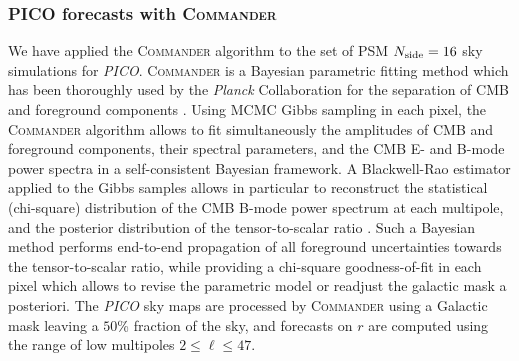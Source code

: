 \documentclass[PICOReport.tex]{subfiles}
\begin{document}
\subsubsection{ PICO forecasts with \textsc{Commander}}

We have applied the \textsc{Commander} algorithm \cite{eriksen/etal:2008} to the set of PSM $N_{\rm side}=16$ sky simulations for \emph{PICO}.
\textsc{Commander} is a Bayesian parametric fitting method which has been thoroughly used by the \emph{Planck} Collaboration for the separation of CMB and foreground components \cite{Planck_2015_X,Planck_2018_IV}. Using MCMC Gibbs sampling in each pixel, the \textsc{Commander} algorithm allows to fit simultaneously the amplitudes of CMB and foreground components, their spectral parameters, and the CMB E- and B-mode power spectra in a self-consistent Bayesian framework. A Blackwell-Rao estimator applied to the Gibbs samples allows in particular to reconstruct the statistical (chi-square) distribution of the CMB B-mode power spectrum at each multipole, and the posterior distribution of the tensor-to-scalar ratio \cite{Remazeilles/etal:2016,Remazeilles/etal:2018}. Such a Bayesian method performs end-to-end propagation of all foreground uncertainties towards the tensor-to-scalar ratio, while providing a chi-square goodness-of-fit in each pixel which allows to revise the parametric model or readjust the galactic mask a posteriori. The \emph{PICO} sky maps are processed by \textsc{Commander} using a Galactic mask leaving a $50$\% fraction of the sky, and forecasts on $r$ are computed using the range of low multipoles $2 \leq \ell \leq 47$.
\end{document}
